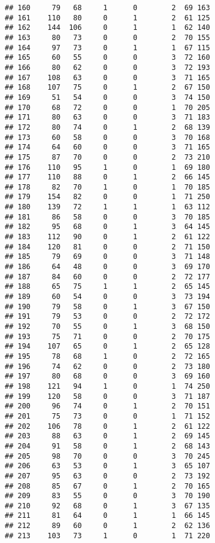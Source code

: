\documentclass[
]{article}
\begin{document}
\begin{verbatim}
## 160     79   68     1      0        2  69 163
## 161    110   80     0      1        2  61 125
## 162    144  106     0      1        1  62 140
## 163     80   73     0      0        2  70 155
## 164     97   73     0      1        1  67 115
## 165     60   55     0      0        3  72 160
## 166     80   62     0      0        3  72 193
## 167    108   63     0      0        3  71 165
## 168    107   75     0      1        2  67 150
## 169     51   54     0      0        3  74 150
## 170     68   72     0      0        1  70 205
## 171     80   63     0      0        3  71 183
## 172     80   74     0      1        2  68 139
## 173     60   58     0      0        3  70 168
## 174     64   60     0      0        3  71 165
## 175     87   70     0      0        2  73 210
## 176    110   95     1      0        1  69 180
## 177    110   88     0      1        2  66 145
## 178     82   70     1      0        1  70 185
## 179    154   82     0      0        1  71 250
## 180    139   72     1      1        1  63 112
## 181     86   58     0      0        3  70 185
## 182     95   68     0      1        3  64 145
## 183    112   90     0      1        2  61 122
## 184    120   81     0      0        2  71 150
## 185     79   69     0      0        3  71 148
## 186     64   48     0      0        3  69 170
## 187     84   60     0      0        2  72 177
## 188     65   75     1      1        2  65 145
## 189     60   54     0      0        3  73 194
## 190     79   58     0      1        3  67 150
## 191     79   53     0      0        2  72 172
## 192     70   55     0      1        3  68 150
## 193     75   71     0      0        2  70 175
## 194    107   65     0      1        2  65 128
## 195     78   68     1      0        2  72 165
## 196     74   62     0      0        2  73 180
## 197     80   68     0      0        3  69 160
## 198    121   94     1      0        1  74 250
## 199    120   58     0      0        3  71 187
## 200     96   74     0      1        2  70 151
## 201     75   73     0      0        1  71 152
## 202    106   78     0      1        2  61 122
## 203     88   63     0      1        2  69 145
## 204     91   58     0      1        2  68 143
## 205     98   70     0      0        3  70 245
## 206     63   53     0      1        3  65 107
## 207     95   63     0      0        2  73 192
## 208     85   67     0      1        2  70 165
## 209     83   55     0      0        3  70 190
## 210     92   68     0      1        3  67 135
## 211     81   64     0      1        1  66 145
## 212     89   60     0      1        2  62 136
## 213    103   73     1      0        1  71 220

\end{verbatim}
\end{document}
